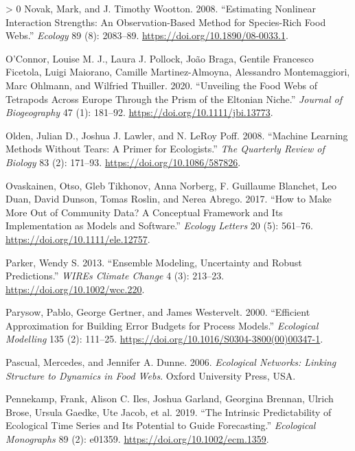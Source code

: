 \documentclass[10pt,oneside]{article}
\newlength{\cslhangindent}
\newenvironment{CSLReferences}[3] %
 {%
  \setlength{\parindent}{0pt}
  \ifodd #1 \everypar{\setlength{\hangindent}{\cslhangindent}}\ignorespaces\fi
  \ifnum #2 > 0
  \setlength{\parskip}{#2\baselineskip}
  \fi
 }%
 {}
\begin{document}
\begin{CSLReferences}{1}{0}
\leavevmode\hypertarget{ref-Novak2008EstNon}{}%
Novak, Mark, and J. Timothy Wootton. 2008. {``Estimating Nonlinear
Interaction Strengths: An Observation-Based Method for Species-Rich Food
Webs.''} \emph{Ecology} 89 (8): 2083--89.
\url{https://doi.org/10.1890/08-0033.1}.

\leavevmode\hypertarget{ref-OConnor2020UnvFoo}{}%
O'Connor, Louise M. J., Laura J. Pollock, João Braga, Gentile Francesco
Ficetola, Luigi Maiorano, Camille Martinez-Almoyna, Alessandro
Montemaggiori, Marc Ohlmann, and Wilfried Thuiller. 2020. {``Unveiling
the Food Webs of Tetrapods Across Europe Through the Prism of the
Eltonian Niche.''} \emph{Journal of Biogeography} 47 (1): 181--92.
\url{https://doi.org/10.1111/jbi.13773}.

\leavevmode\hypertarget{ref-Olden2008MacLea}{}%
Olden, Julian D., Joshua J. Lawler, and N. LeRoy Poff. 2008. {``Machine
Learning Methods Without Tears: A Primer for Ecologists.''} \emph{The
Quarterly Review of Biology} 83 (2): 171--93.
\url{https://doi.org/10.1086/587826}.

\leavevmode\hypertarget{ref-Ovaskainen2017HowMak}{}%
Ovaskainen, Otso, Gleb Tikhonov, Anna Norberg, F. Guillaume Blanchet,
Leo Duan, David Dunson, Tomas Roslin, and Nerea Abrego. 2017. {``How to
Make More Out of Community Data? A Conceptual Framework and Its
Implementation as Models and Software.''} \emph{Ecology Letters} 20 (5):
561--76. \url{https://doi.org/10.1111/ele.12757}.

\leavevmode\hypertarget{ref-Parker2013EnsMod}{}%
Parker, Wendy S. 2013. {``Ensemble Modeling, Uncertainty and Robust
Predictions.''} \emph{WIREs Climate Change} 4 (3): 213--23.
\url{https://doi.org/10.1002/wcc.220}.

\leavevmode\hypertarget{ref-Parysow2000EffApp}{}%
Parysow, Pablo, George Gertner, and James Westervelt. 2000. {``Efficient
Approximation for Building Error Budgets for Process Models.''}
\emph{Ecological Modelling} 135 (2): 111--25.
\url{https://doi.org/10.1016/S0304-3800(00)00347-1}.

\leavevmode\hypertarget{ref-Pascual2006EcoNet}{}%
Pascual, Mercedes, and Jennifer A. Dunne. 2006. \emph{Ecological
Networks: Linking Structure to Dynamics in Food Webs}. Oxford University
Press, USA.

\leavevmode\hypertarget{ref-Pennekamp2019IntPre}{}%
Pennekamp, Frank, Alison C. Iles, Joshua Garland, Georgina Brennan,
Ulrich Brose, Ursula Gaedke, Ute Jacob, et al. 2019. {``The Intrinsic
Predictability of Ecological Time Series and Its Potential to Guide
Forecasting.''} \emph{Ecological Monographs} 89 (2): e01359.
\url{https://doi.org/10.1002/ecm.1359}.


\end{CSLReferences}
\end{document}
